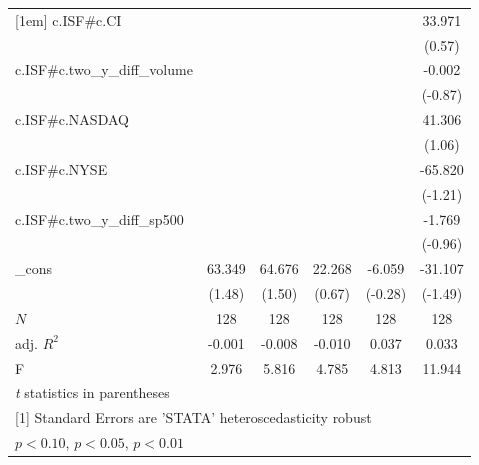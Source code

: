 \begin{table}[htbp]
\begin{tabular}{l*{5}{c}}
[1em]
c.ISF#c.CI  &                     &                     &                     &                     &      33.971         \\
            &                     &                     &                     &                     &      (0.57)         \\
[1em]
c.ISF#c.two\_y\_diff\_volume&                     &                     &                     &                     &      -0.002         \\
            &                     &                     &                     &                     &     (-0.87)         \\
[1em]
c.ISF#c.NASDAQ&                     &                     &                     &                     &      41.306         \\
            &                     &                     &                     &                     &      (1.06)         \\
[1em]
c.ISF#c.NYSE&                     &                     &                     &                     &     -65.820         \\
            &                     &                     &                     &                     &     (-1.21)         \\
[1em]
c.ISF#c.two\_y\_diff\_sp500&                     &                     &                     &                     &      -1.769         \\
            &                     &                     &                     &                     &     (-0.96)         \\
[1em]
\_cons      &      63.349         &      64.676         &      22.268         &      -6.059         &     -31.107         \\
            &      (1.48)         &      (1.50)         &      (0.67)         &     (-0.28)         &     (-1.49)         \\
\hline
\(N\)       &         128         &         128         &         128         &         128         &         128         \\
adj. \(R^{2}\)&      -0.001         &      -0.008         &      -0.010         &       0.037         &       0.033         \\
F           &       2.976         &       5.816         &       4.785         &       4.813         &      11.944         \\
\hline\hline
\multicolumn{6}{l}{\footnotesize \textit{t} statistics in parentheses}\\
\multicolumn{6}{l}{\footnotesize [1] Standard Errors are 'STATA' heteroscedasticity robust}\\
\multicolumn{6}{l}{\footnotesize \sym{*} \(p<0.10\), \sym{**} \(p<0.05\), \sym{***} \(p<0.01\)}\\
\end{tabular}
\end{table}
